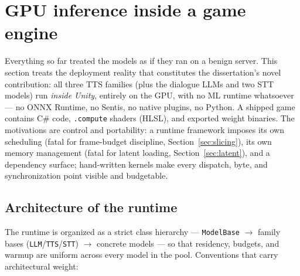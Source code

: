 \documentclass[11pt,a4paper]{article}
\newcommand{\code}[1]{\texttt{#1}}
\begin{document}
\section{GPU inference inside a game engine}
\label{sec:engine}

Everything so far treated the models as if they ran on a benign server. This section
treats the deployment reality that constitutes the dissertation's novel contribution:
all three TTS families (plus the dialogue LLMs and two STT models) run \emph{inside
Unity}, entirely on the GPU, with no ML runtime whatsoever --- no ONNX Runtime, no
Sentis, no native plugins, no Python. A shipped game contains C\# code, \code{.compute}
shaders (HLSL), and exported weight binaries. The motivations are control and
portability: a runtime framework imposes its own scheduling (fatal for frame-budget
discipline, Section~\ref{sec:slicing}), its own memory management (fatal for latent
loading, Section~\ref{sec:latent}), and a dependency surface; hand-written kernels make
every dispatch, byte, and synchronization point visible and budgetable.

\subsection{Architecture of the runtime}
\label{sec:runtime-arch}

The runtime is organized as a strict class hierarchy --- \code{ModelBase} $\to$ family
bases (\code{LLM}/\code{TTS}/\code{STT}) $\to$ concrete models --- so that residency,
budgets, and warmup are uniform across every model in the pool. Conventions that carry
architectural weight:
\end{document}
